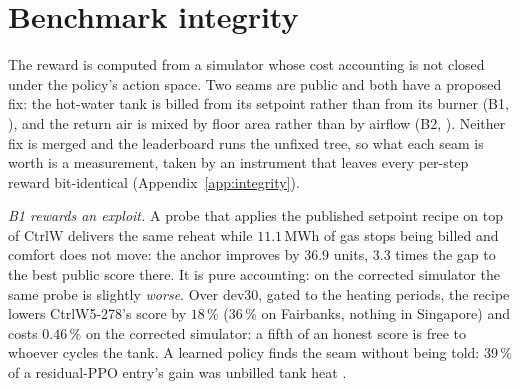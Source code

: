 \providecommand{\pending}[1]{\textcolor{red}{[pending: #1]}}
\providecommand{\e}[1]{\times10^{-#1}}

\section{Benchmark integrity}
\label{sec:integrity}

The reward is computed from a simulator whose cost accounting is not closed under the
policy's action space. Two seams are public and both have a proposed fix: the hot-water
tank is billed from its setpoint rather than from its burner (B1, \citep{stncsn2026pr2}), and
the return air is mixed by floor area rather than by airflow (B2, \citep{stncsn2026pr3}).
Neither fix is merged and the leaderboard runs the unfixed tree, so what each seam is
worth is a measurement, taken by an instrument that leaves every per-step reward bit-identical
(Appendix~\ref{app:integrity}). %

\emph{B1 rewards an exploit.} A probe that applies the published setpoint recipe on top of CtrlW
delivers the same reheat while $11.1$\,MWh of gas stops being billed and comfort does not move:
the anchor improves by $36.9$ units, $3.3$ times the gap to the best public score there. It is
pure accounting: on the corrected simulator the same probe is slightly \emph{worse}. Over dev30,
gated to the heating periods, the recipe lowers CtrlW5-278's score by $18\,\%$ ($36\,\%$ on
Fairbanks, nothing in Singapore) and costs $0.46\,\%$ on the corrected simulator: a fifth of an
honest score is free to whoever cycles the tank.
A learned policy finds the seam without being told: $39\,\%$ of a residual-PPO entry's gain was
unbilled tank heat \citep{alex2026residualppo}.


